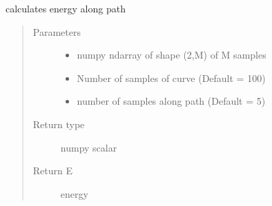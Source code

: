 \documentclass[letterpaper,10pt,english]{sphinxmanual}
\begin{document}
\begin{fulllineitems}
\label{\detokenize{geodesic:geodesic.calculate_energy}}
calculates energy along path
\begin{quote}\begin{description}
\item[{Parameters}] \leavevmode\begin{itemize}
\item {} 
 \textendash{} numpy ndarray of shape (2,M) of M samples

\item {} 
 \textendash{} Number of samples of curve (Default = 100)

\item {} 
 \textendash{} number of samples along path (Default = 5)

\end{itemize}

\item[{Return type}] \leavevmode
numpy scalar

\item[{Return E}] \leavevmode
energy

\end{description}\end{quote}

\end{fulllineitems}

\end{document}
